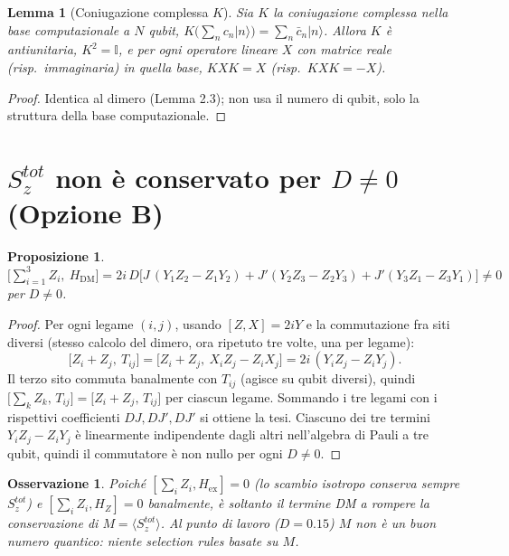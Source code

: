\documentclass[11pt,a4paper]{article}
\newtheorem{lemma}{Lemma}
\newtheorem{proposizione}{Proposizione}
\newtheorem{osservazione}{Osservazione}
\newcommand{\ket}[1]{\lvert #1 \rangle}
\begin{document}
\begin{lemma}[Coniugazione complessa $K$]
\label{lem:K}
Sia $K$ la coniugazione complessa nella base computazionale a $N$ qubit,
$K\big(\sum_n c_n\ket n\big)=\sum_n\bar c_n\ket n$. Allora $K$ è antiunitaria, $K^2=\mathbb I$, e
per ogni operatore lineare $X$ con matrice reale (risp.\ immaginaria) in quella base,
$KXK=X$ (risp.\ $KXK=-X$).
\end{lemma}
\begin{proof}
Identica al dimero (Lemma 2.3); non usa il numero di qubit, solo la struttura della base
computazionale.
\end{proof}

\section{$S_z^{tot}$ non è conservato per $D\neq0$ (Opzione B)}

\begin{proposizione}
\label{prop:Sz-rotto}
$\displaystyle\Big[\sum_{i=1}^3 Z_i,\ H_{\mathrm{DM}}\Big] = 2i\,D\big[J\,(Y_1Z_2-Z_1Y_2)+J'(Y_2Z_3-Z_2Y_3)+J'(Y_3Z_1-Z_3Y_1)\big]\neq0$
per $D\neq0$.
\end{proposizione}
\begin{proof}
Per ogni legame $(i,j)$, usando $[Z,X]=2iY$ e la commutazione fra siti diversi (stesso calcolo
del dimero, ora ripetuto tre volte, una per legame):
$$\big[Z_i+Z_j,\ T_{ij}\big] = \big[Z_i+Z_j,\ X_iZ_j-Z_iX_j\big] = 2i\,(Y_iZ_j-Z_iY_j).$$
Il terzo sito commuta banalmente con $T_{ij}$ (agisce su qubit diversi), quindi
$\big[\sum_k Z_k,\,T_{ij}\big]=\big[Z_i+Z_j,\,T_{ij}\big]$ per ciascun legame. Sommando i tre
legami con i rispettivi coefficienti $DJ,DJ',DJ'$ si ottiene la tesi. Ciascuno dei tre termini
$Y_iZ_j-Z_iY_j$ è linearmente indipendente dagli altri nell'algebra di Pauli a tre qubit, quindi
il commutatore è non nullo per ogni $D\neq0$.
\end{proof}

\begin{sloppypar}
\begin{osservazione}
Poiché $[\sum_iZ_i,H_{\mathrm{ex}}]=0$ (lo scambio isotropo conserva sempre $S_z^{tot}$)
e $[\sum_iZ_i,H_Z]=0$ banalmente, è soltanto il termine DM a rompere la conservazione
di $M=\langle S_z^{tot}\rangle$. Al punto di lavoro ($D=0.15$) $M$ non è un buon numero
quantico: niente selection rules basate su $M$.
\end{osservazione}
\end{sloppypar}
\end{document}
